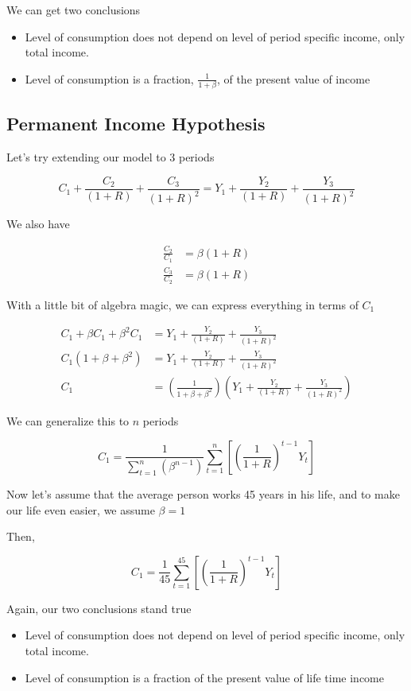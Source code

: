 \documentclass[11pt]{scrartcl}
\begin{document}
We can get two conclusions

\begin{itemize}
\item Level of consumption does not depend on level of period specific income, only total income.
\item Level of consumption is a fraction, $\frac{1}{1+\beta}$, of the present value of income
\end{itemize}

\subsection{Permanent Income Hypothesis}

Let's try extending our model to 3 periods

\[ C_1 + \frac{C_2}{(1+R)} + \frac{C_3}{(1+R)^2} = Y_1 + \frac{Y_2}{(1+R)} + \frac{Y_3}{(1+R)^2} \]

We also have

\begin{align*}
\frac{C_2}{C_1} &= \beta (1+R) \\
\frac{C_3}{C_2} &= \beta (1+R)
\end{align*}

With a little bit of algebra magic, we can express everything in terms of $C_1$

\begin{align*}
C_1 + \beta C_1 + \beta^2 C_1 &=  Y_1 + \frac{Y_2}{(1+R)} + \frac{Y_3}{(1+R)^2} \\
C_1 (1+\beta + \beta^2) &=  Y_1 + \frac{Y_2}{(1+R)} + \frac{Y_3}{(1+R)^2}\\
C_1 &= \left(\frac{1}{1+\beta + \beta^2}\right) \left(Y_1 + \frac{Y_2}{(1+R)} + \frac{Y_3}{(1+R)^2}\right)
\end{align*}

We can generalize this to $n$ periods

\[ C_1 = \frac{1}{\sum\limits_{t=1}^{n} \left( \beta^{n-1} \right)} \sum\limits_{t=1}^{n}\left[ \left( \frac{1}{1+R}\right)^{t-1} Y_t \right] \] 

Now let's assume that the average person works 45 years in his life, and to make our life even easier, we assume $\beta = 1$

Then,

\[ C_1 = \frac{1}{45} \sum\limits_{t=1}^{45}\left[ \left( \frac{1}{1+R}\right)^{t-1} Y_t \right] \]

Again, our two conclusions stand true

\begin{itemize}
\item Level of consumption does not depend on level of period specific income, only total income.
\item Level of consumption is a fraction of the present value of life time income
\end{itemize}
\end{document}
